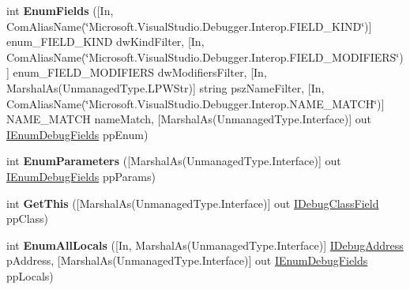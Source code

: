 \begin{DoxyCompactItemize}
\item 
\hypertarget{interface_microsoft_1_1_visual_studio_1_1_debugger_1_1_interop_e_e_1_1_i_debug_method_field_aeb9041ca64b2a85311a8f29621686eef}{int {\bfseries Enum\+Fields} (\mbox{[}In, Com\+Alias\+Name(\char`\"{}Microsoft.\+Visual\+Studio.\+Debugger.\+Interop.\+F\+I\+E\+L\+D\+\_\+\+K\+I\+N\+D\char`\"{})\mbox{]} enum\+\_\+\+F\+I\+E\+L\+D\+\_\+\+K\+I\+N\+D dw\+Kind\+Filter, \mbox{[}In, Com\+Alias\+Name(\char`\"{}Microsoft.\+Visual\+Studio.\+Debugger.\+Interop.\+F\+I\+E\+L\+D\+\_\+\+M\+O\+D\+I\+F\+I\+E\+R\+S\char`\"{})\mbox{]} enum\+\_\+\+F\+I\+E\+L\+D\+\_\+\+M\+O\+D\+I\+F\+I\+E\+R\+S dw\+Modifiers\+Filter, \mbox{[}In, Marshal\+As(Unmanaged\+Type.\+L\+P\+W\+Str)\mbox{]} string psz\+Name\+Filter, \mbox{[}In, Com\+Alias\+Name(\char`\"{}Microsoft.\+Visual\+Studio.\+Debugger.\+Interop.\+N\+A\+M\+E\+\_\+\+M\+A\+T\+C\+H\char`\"{})\mbox{]} N\+A\+M\+E\+\_\+\+M\+A\+T\+C\+H name\+Match, \mbox{[}Marshal\+As(Unmanaged\+Type.\+Interface)\mbox{]} out \hyperlink{interface_microsoft_1_1_visual_studio_1_1_debugger_1_1_interop_e_e_1_1_i_enum_debug_fields}{I\+Enum\+Debug\+Fields} pp\+Enum)}\label{interface_microsoft_1_1_visual_studio_1_1_debugger_1_1_interop_e_e_1_1_i_debug_method_field_aeb9041ca64b2a85311a8f29621686eef}

\item 
\hypertarget{interface_microsoft_1_1_visual_studio_1_1_debugger_1_1_interop_e_e_1_1_i_debug_method_field_a97962920a925dc72359a467080a158a2}{int {\bfseries Enum\+Parameters} (\mbox{[}Marshal\+As(Unmanaged\+Type.\+Interface)\mbox{]} out \hyperlink{interface_microsoft_1_1_visual_studio_1_1_debugger_1_1_interop_e_e_1_1_i_enum_debug_fields}{I\+Enum\+Debug\+Fields} pp\+Params)}\label{interface_microsoft_1_1_visual_studio_1_1_debugger_1_1_interop_e_e_1_1_i_debug_method_field_a97962920a925dc72359a467080a158a2}

\item 
\hypertarget{interface_microsoft_1_1_visual_studio_1_1_debugger_1_1_interop_e_e_1_1_i_debug_method_field_a324804f44b3f45772b24721635d3a973}{int {\bfseries Get\+This} (\mbox{[}Marshal\+As(Unmanaged\+Type.\+Interface)\mbox{]} out \hyperlink{interface_microsoft_1_1_visual_studio_1_1_debugger_1_1_interop_e_e_1_1_i_debug_class_field}{I\+Debug\+Class\+Field} pp\+Class)}\label{interface_microsoft_1_1_visual_studio_1_1_debugger_1_1_interop_e_e_1_1_i_debug_method_field_a324804f44b3f45772b24721635d3a973}

\item 
\hypertarget{interface_microsoft_1_1_visual_studio_1_1_debugger_1_1_interop_e_e_1_1_i_debug_method_field_ad71d749243e426e75a1addb72eb2a2aa}{int {\bfseries Enum\+All\+Locals} (\mbox{[}In, Marshal\+As(Unmanaged\+Type.\+Interface)\mbox{]} \hyperlink{interface_microsoft_1_1_visual_studio_1_1_debugger_1_1_interop_e_e_1_1_i_debug_address}{I\+Debug\+Address} p\+Address, \mbox{[}Marshal\+As(Unmanaged\+Type.\+Interface)\mbox{]} out \hyperlink{interface_microsoft_1_1_visual_studio_1_1_debugger_1_1_interop_e_e_1_1_i_enum_debug_fields}{I\+Enum\+Debug\+Fields} pp\+Locals)}\label{interface_microsoft_1_1_visual_studio_1_1_debugger_1_1_interop_e_e_1_1_i_debug_method_field_ad71d749243e426e75a1addb72eb2a2aa}


\end{DoxyCompactItemize}

